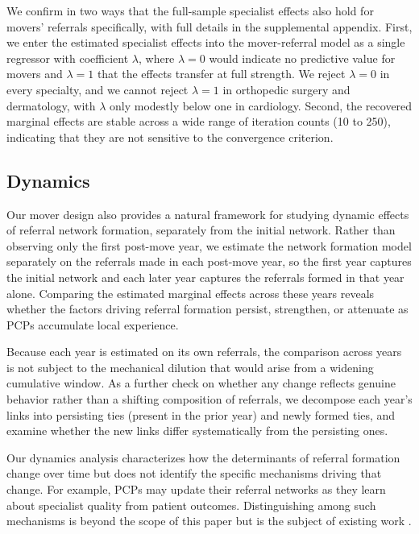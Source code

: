\documentclass[12pt]{article}
\begin{document}
We confirm in two ways that the full-sample specialist effects also hold for movers' referrals specifically, with full details in the supplemental appendix. First, we enter the estimated specialist effects into the mover-referral model as a single regressor with coefficient $\lambda$, where $\lambda = 0$ would indicate no predictive value for movers and $\lambda = 1$ that the effects transfer at full strength. We reject $\lambda = 0$ in every specialty, and we cannot reject $\lambda = 1$ in orthopedic surgery and dermatology, with $\lambda$ only modestly below one in cardiology. Second, the recovered marginal effects are stable across a wide range of iteration counts (10 to 250), indicating that they are not sensitive to the convergence criterion.

\subsection{Dynamics}
\label{sec:dynamics-method}

Our mover design also provides a natural framework for studying dynamic effects of referral network formation, separately from the initial network. Rather than observing only the first post-move year, we estimate the network formation model separately on the referrals made in each post-move year, so the first year captures the initial network and each later year captures the referrals formed in that year alone. Comparing the estimated marginal effects across these years reveals whether the factors driving referral formation persist, strengthen, or attenuate as PCPs accumulate local experience.

Because each year is estimated on its own referrals, the comparison across years is not subject to the mechanical dilution that would arise from a widening cumulative window. As a further check on whether any change reflects genuine behavior rather than a shifting composition of referrals, we decompose each year's links into persisting ties (present in the prior year) and newly formed ties, and examine whether the new links differ systematically from the persisting ones.

Our dynamics analysis characterizes how the determinants of referral formation change over time but does not identify the specific mechanisms driving that change. For example, PCPs may update their referral networks as they learn about specialist quality from patient outcomes. Distinguishing among such mechanisms is beyond the scope of this paper but is the subject of existing work \citep{mccarthy2026}.
\end{document}
